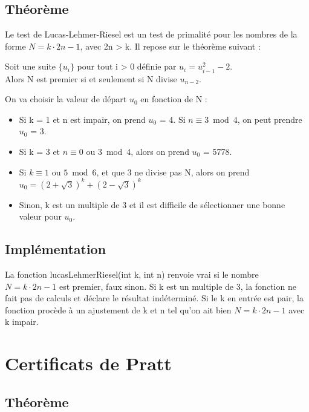 \documentclass[a4paper]{article}
\begin{document}
\subsection{Théorème}

Le test de Lucas-Lehmer-Riesel est un test de primalité pour les nombres
de la forme $N = k \cdot 2n - 1$, avec 2n > k. Il repose sur le théorème suivant :

\begin{theorem}
Soit une suite $\{u_i\}$ pour tout i > 0 définie par $u_i = u_{i-1}^2 - 2$.\\
Alors N est premier si et seulement si N divise $u_{n-2}$.
\end{theorem}

On va choisir la valeur de départ $u_0$ en fonction de N :
\begin{itemize}
\item Si k = 1 et n est impair, on prend $u_0$ = 4. Si $n \equiv 3 \bmod{4}$, on peut prendre $u_0$ = 3.
\item Si k = 3 et $n \equiv 0$ ou $3 \bmod{4}$, alors on prend $u_0$ = 5778.
\item Si $k \equiv 1$ ou $5 \bmod{6}$, et que 3 ne divise pas N, alors on prend $u_0 = (2 + \sqrt{3})^k + (2 - \sqrt{3})^k$
\item Sinon, k est un multiple de 3 et il est difficile de sélectionner une bonne valeur pour $u_0$.
\end{itemize}

\subsection{Implémentation}

La fonction lucasLehmerRiesel(int k, int n) renvoie vrai si le nombre $N = k \cdot 2n - 1$
est premier, faux sinon. Si k est un multiple de 3, la fonction ne fait pas de calculs
et déclare le résultat indéterminé. Si le k en entrée est pair, la fonction procède à un ajustement
de k et n tel qu'on ait bien $N = k \cdot 2n - 1$ avec k impair.

\newpage

\section{Certificats de Pratt}

\subsection{Théorème}
\end{document}
